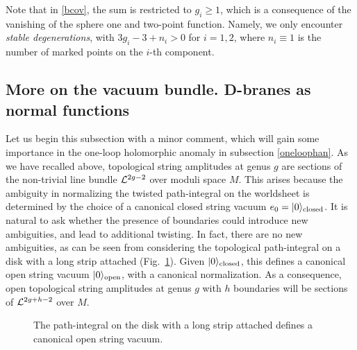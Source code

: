 Note that in \eqref{bcov}, the sum is restricted to $g_i\ge 1$, which
is a consequence of the vanishing of the sphere one and two-point function.
Namely, we only encounter {\it stable degenerations}, with $3g_i-3+n_i>0$
for $i=1,2$, where $n_i\equiv 1$ is the number of marked points on the $i$-th
component.


\subsection{More on the vacuum bundle. D-branes as normal functions}
\label{more}

Let us begin this subsection with a minor comment, which will gain 
some importance in the one-loop holomorphic anomaly in subsection 
\ref{oneloophan}. As we have recalled above, topological string 
amplitudes at genus $g$ are sections of the non-trivial line bundle 
${\cal L}^{2g-2}$ over moduli space $M$. This arises because the 
ambiguity in normalizing the twisted path-integral on the worldsheet 
is determined by the choice of a canonical closed string vacuum 
$e_0=|0\rangle_{\rm closed}$. It is natural to ask whether the 
presence of boundaries could introduce new ambiguities, and lead to 
additional twisting. In fact, there are no new ambiguities, as can be 
seen from considering the topological path-integral on a disk with a 
long strip attached (Fig.\ \ref{attached}). Given $|0\rangle_{\rm closed}$,
this defines a canonical open string vacuum $|0\rangle_{\rm open}$, with 
a canonical normalization. As a consequence, open topological string 
amplitudes at genus $g$ with $h$ boundaries will be sections of 
${\cal L}^{2g+h-2}$ over $M$.
\begin{figure}[ht]
\begin{center}
\caption{The path-integral on the disk with a long strip attached 
defines a canonical open string vacuum.}
\label{attached}
\end{center}
\end{figure}

